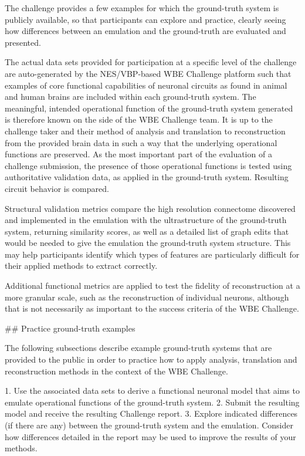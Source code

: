 \documentclass{ldr-article}
\begin{document}
The challenge provides a few examples for which the ground-truth system is publicly available,
so that participants can explore and practice, clearly seeing how differences between an emulation and
the ground-truth are evaluated and presented.

The actual data sets provided for participation at a specific level of the challenge are
auto-generated by the NES/VBP-based WBE Challenge platform such that examples of core functional
capabilities of neuronal circuits as found in animal and human brains are included within each
ground-truth system. The meaningful, intended operational function of the ground-truth system
generated is therefore known on the side of the WBE Challenge team. It is up to the challenge
taker and their method of analysis and translation to reconstruction from the provided brain data
in such a way that the underlying operational functions are preserved. As the most important part
of the evaluation of a challenge submission, the presence of those operational functions is
tested using authoritative validation data, as applied in the ground-truth system. Resulting
circuit behavior is compared.

Structural validation metrics compare the high resolution connectome discovered and implemented
in the emulation with the ultrastructure of the ground-truth system, returning similarity scores,
as well as a detailed list of graph edits that would be needed to give the emulation the
ground-truth system structure. This may help participants identify which types of features are
particularly difficult for their applied methods to extract correctly.

Additional functional metrics are applied to test the fidelity of reconstruction at a more
granular scale, such as the reconstruction of individual neurons, although that is not necessarily
as important to the success criteria of the WBE Challenge.

## Practice ground-truth examples

The following subsections describe example ground-truth systems that are provided to the public
in order to practice how to apply analysis, translation and reconstruction methods in the
context of the WBE Challenge.

1. Use the associated data sets to derive a functional neuronal model that aims to emulate operational
   functions of the ground-truth system.
2. Submit the resulting model and receive the resulting Challenge report.
3. Explore indicated differences (if there are any) between the ground-truth system and the emulation.
   Consider how differences detailed in the report may be used to improve the results of your methods.
\end{document}
